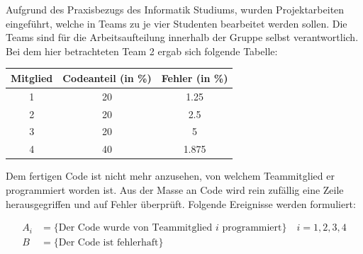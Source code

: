 \documentclass{abgabe}
\begin{document}
\begin{questions}
    \question
    Aufgrund des Praxisbezugs des Informatik Studiums, wurden Projektarbeiten eingeführt, welche in Teams zu je vier Studenten bearbeitet werden sollen.
    Die Teams sind für die Arbeitsaufteilung innerhalb der Gruppe selbst verantwortlich.
    Bei dem hier betrachteten Team 2  ergab sich folgende Tabelle:

    \begin{center}
        \begin{tabular}{|c|c|c|}
            \hline
            Mitglied & Codeanteil (in \%) & Fehler (in \%) \\
            \hline
            1        & 20                 & 1.25           \\
            2        & 20                 & 2.5            \\
            3        & 20                 & 5              \\
            4        & 40                 & 1.875          \\
            \hline
        \end{tabular}
    \end{center}

    Dem fertigen Code ist nicht mehr anzusehen, von welchem Teammitglied er programmiert worden ist.
    Aus der Masse an Code wird rein zufällig eine Zeile herausgegriffen und auf Fehler überprüft.
    Folgende Ereignisse werden formuliert:

    \[
        \begin{aligned}
            A_i & = \{ \text{Der Code wurde von Teammitglied $i$ programmiert} \} \quad i = 1,2,3,4 \\
            B   & = \{ \text{Der Code ist fehlerhaft} \}
        \end{aligned}
    \]

    \begin{parts}

\end{parts}
\end{questions}
\end{document}

